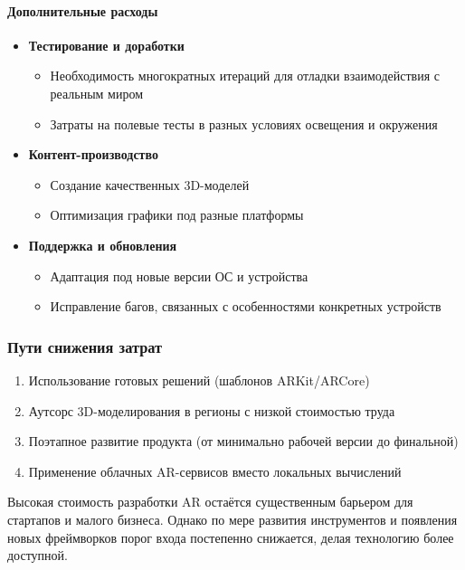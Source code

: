 \paragraph{Дополнительные расходы}
\begin{itemize}
    \item \textbf{Тестирование и доработки}
    \begin{itemize}
        \item Необходимость многократных итераций для отладки взаимодействия с реальным миром
        \item Затраты на полевые тесты в разных условиях освещения и окружения
    \end{itemize}
    
    \item \textbf{Контент-производство}
    \begin{itemize}
        \item Создание качественных 3D-моделей
        \item Оптимизация графики под разные платформы
    \end{itemize}
    
    \item \textbf{Поддержка и обновления}
    \begin{itemize}
        \item Адаптация под новые версии ОС и устройства
        \item Исправление багов, связанных с особенностями конкретных устройств
    \end{itemize}
\end{itemize}

\subsubsection{Пути снижения затрат}
\begin{enumerate}
    \item Использование готовых решений (шаблонов ARKit/ARCore)
    \item Аутсорс 3D-моделирования в регионы с низкой стоимостью труда
    \item Поэтапное развитие продукта (от минимально рабочей версии до финальной)
    \item Применение облачных AR-сервисов вместо локальных вычислений
\end{enumerate}

Высокая стоимость разработки AR остаётся существенным барьером для стартапов и малого бизнеса. Однако по мере развития инструментов и появления новых фреймворков порог входа постепенно снижается, делая технологию более доступной.

